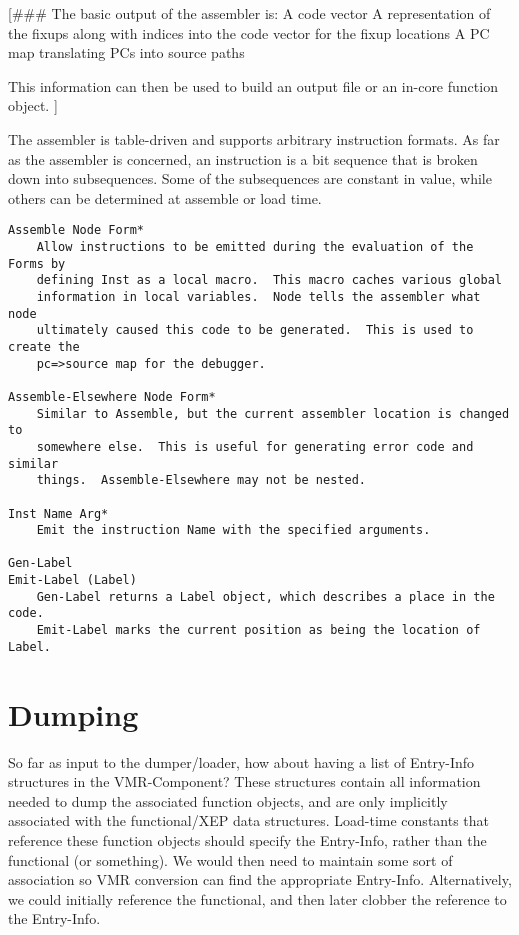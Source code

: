[\#\#\# The basic output of the assembler is:
    A code vector
    A representation of the fixups along with indices into the code vector for
      the fixup locations
    A PC map translating PCs into source paths

This information can then be used to build an output file or an in-core
function object.
]

The assembler is table-driven and supports arbitrary instruction formats.  As
far as the assembler is concerned, an instruction is a bit sequence that is
broken down into subsequences.  Some of the subsequences are constant in value,
while others can be determined at assemble or load time.

\begin{verbatim}
Assemble Node Form*
    Allow instructions to be emitted during the evaluation of the Forms by
    defining Inst as a local macro.  This macro caches various global
    information in local variables.  Node tells the assembler what node
    ultimately caused this code to be generated.  This is used to create the
    pc=>source map for the debugger.

Assemble-Elsewhere Node Form*
    Similar to Assemble, but the current assembler location is changed to
    somewhere else.  This is useful for generating error code and similar
    things.  Assemble-Elsewhere may not be nested.

Inst Name Arg*
    Emit the instruction Name with the specified arguments.

Gen-Label
Emit-Label (Label)
    Gen-Label returns a Label object, which describes a place in the code.
    Emit-Label marks the current position as being the location of Label.
\end{verbatim}



\chapter{Dumping}

So far as input to the dumper/loader, how about having a list of Entry-Info
structures in the VMR-Component?  These structures contain all information
needed to dump the associated function objects, and are only implicitly
associated with the functional/XEP data structures.  Load-time constants that
reference these function objects should specify the Entry-Info, rather than the
functional (or something).  We would then need to maintain some sort of
association so VMR conversion can find the appropriate Entry-Info.
Alternatively, we could initially reference the functional, and then later
clobber the reference to the Entry-Info.

